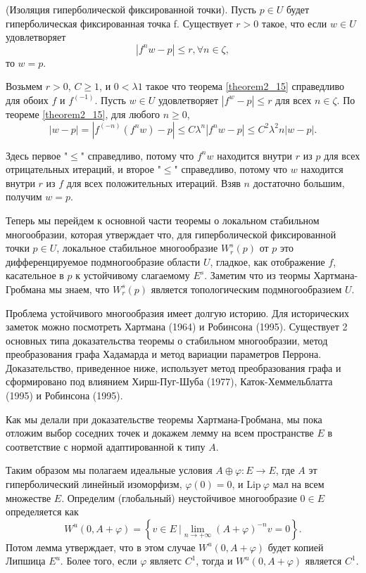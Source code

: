 \begin{theorem}
\label{theorem2_16} (Изоляция гиперболической фиксированной точки). Пусть $p \in U$ будет гиперболическая фиксированная точка f. Существует $r > 0$ такое, что если $w \in U$ удовлетворяет
$$
|f^n w - p| \leqslant r, \forall n \in \zeta,
$$
то $w = p$.
\end{theorem}
\begin{demo} 
Возьмем $r > 0$, $C \geqslant 1$, и $0 < \lambda 1$ такое что теорема \ref{theorem2_15} справедливо для обоих $f$  и $f^(-1)$. Пусть $w \in U$ удовлетворяет $|f^ w - p| \leqslant r$ для всех $n \in \zeta$. По теореме \ref{theorem2_15}, для любого $n \geqslant 0$,
$$
|w - p| = |f^(-n)(f^n w) - p| \leqslant C \lambda^n |f^n w - p| \leqslant C^2 \lambda^2n |w - p|.
$$

Здесь первое "$\leq$" справедливо, потому что $f^n w$ находится внутри $r$ из $p$ для всех отрицательных итераций, и второе "$\leq$" справедливо, потому что $w$ находится внутри $r$ из $f$ для всех положительных итераций. Взяв $n$  достаточно большим, получим $w = p$. 

Теперь мы перейдем к основной части теоремы о локальном стабильном многообразии, которая утверждает что, для гиперболической фиксированной точки $p \in U$, локальное стабильное многообразие $W_r^s(p)$ от $p$ это дифференцируемое подмногообразие области $U$, гладкое, как отображение $f$, касательное в $p$ к устойчивому слагаемому $E^s$. Заметим что из теормы Хартмана-Гробмана мы знаем, что $W_r^s(p)$ является топологическим подмногообразием $U$. 

Проблема устойчивого многообразия имеет долгую историю. Для исторических заметок можно посмотреть Хартмана (1964) и Робинсона (1995). Существует 2 основных типа доказательства теоремы о стабильном многообразии, метод преобразования графа Хадамарда и метод вариации параметров Перрона. Доказательство, приведенное ниже, использует метод преобразования графа и сформировано под влиянием Хирш-Пуг-Шуба (1977), Каток-Хеммельблатта (1995) и Робинсона (1995). 

Как мы делали при доказательстве теоремы Хартмана-Гробмана, мы пока отложим выбор соседних точек и докажем лемму на всем пространстве $E$ в соответствие с нормой адаптированной к типу $A$. 

Таким образом мы полагаем идеальные условия $A \oplus \varphi : E \rightarrow E$, где $A$ эт гиперболический линейный изоморфизм, $\varphi(0)=0$, и $\mathrm{Lip} \  \varphi$ мал на всем множестве $E$. Определим (глобальный) неустойчивое многообразие $0 \in E$ определяется как
$$
W^u(0,A+\varphi) = \left\{ v \in E \ | \lim_{n\rightarrow + \infty}{(A+\varphi)^{-n}v=0} \right\}.
$$
Потом лемма утверждает, что в этом случае $W^u(0,A+\varphi)$ будет копией Липшица $E^u$. Более того, если $\varphi$ являетс $C^1$, тогда и $W^u(0, A + \varphi)$ является $C^1$.
\end{demo}
